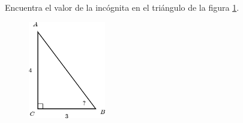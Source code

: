 Encuentra el valor de la incógnita en el triángulo de la figura \ref{fig:angle_functrig_21}.
\begin{figure}[H]
    \begin{center}
        \includegraphics[width=0.3\textwidth]{../images/angle_functrig_21.png}
    \end{center}
    \caption{}
    \label{fig:angle_functrig_21}
\end{figure}